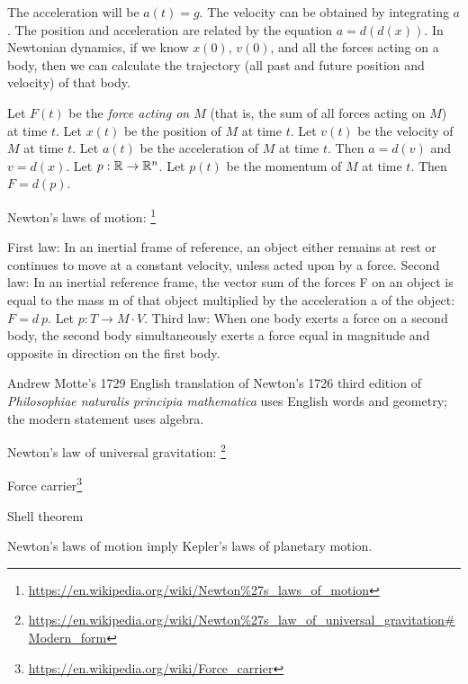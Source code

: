 The acceleration will be \( a(t) = g \).
The velocity can be obtained by integrating \( a \).
The position and acceleration are related by the equation \( a = d(d(x)) \).
In Newtonian dynamics, if we know \( x(0) \), \( v(0) \),
and all the forces acting on a body,
then we can calculate the trajectory (all past and future position and velocity) of that body.

Let \( F(t) \) be the \emph{force acting on \( M \)} (that is, the sum of all forces acting on \(M\)) at time \(t\).
Let \( x(t) \) be the position of \( M \) at time \(t\).
Let \( v(t) \) be the velocity of \( M \) at time \(t\).
Let \( a(t) \) be the acceleration of \( M \) at time \(t\).
Then \( a = d(v) \) and \( v = d(x) \).
Let \( p : \mathbb{R} \to \mathbb{R}^n \).
Let \( p(t) \) be the momentum of \( M \) at time \( t \).
Then \( F = d(p) \).

Newton's laws of motion:%
\footnote{\url{https://en.wikipedia.org/wiki/Newton\%27s_laws_of_motion}}

First law:
In an inertial frame of reference, an object either remains at rest or continues to move at a constant velocity, unless acted upon by a force.
Second law:
In an inertial reference frame, the vector sum of the forces F on an object is equal to the mass m of that object multiplied by the acceleration a of the object: \( F = d \ p \).
Let \( p : T \to M \cdot V \).
Third law:
When one body exerts a force on a second body, the second body simultaneously exerts a force equal in magnitude and opposite in direction on the first body.

Andrew Motte's 1729 English translation of Newton's 1726 third edition of
\emph{Philosophiae naturalis principia mathematica} uses English words and geometry;
the modern statement uses algebra.

Newton's law of universal gravitation:%
\footnote{\url{https://en.wikipedia.org/wiki/Newton\%27s_law_of_universal_gravitation\#Modern_form}}

Force carrier\footnote{\url{https://en.wikipedia.org/wiki/Force_carrier}}



Shell theorem

Newton's laws of motion imply Kepler's laws of planetary motion.
